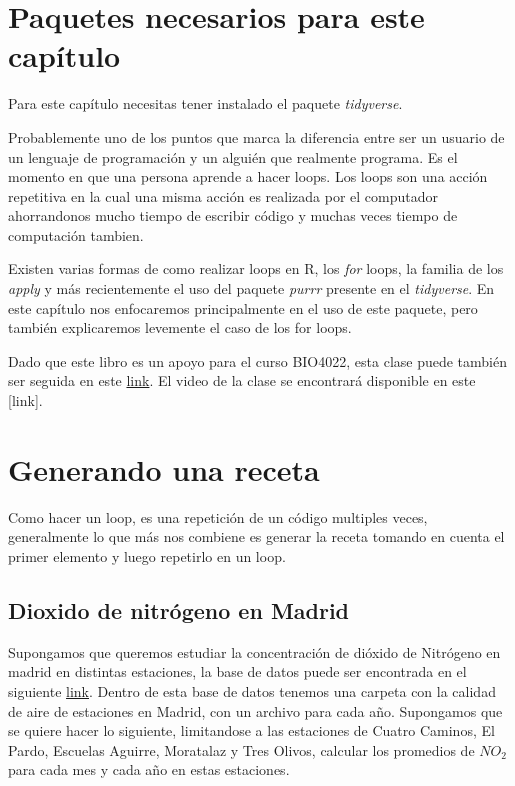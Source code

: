 \documentclass[]{book}
\begin{document}
\hypertarget{paquetes-necesarios-para-este-capitulo-5}{%
\section{Paquetes necesarios para este
capítulo}\label{paquetes-necesarios-para-este-capitulo-5}}

Para este capítulo necesitas tener instalado el paquete
\emph{tidyverse}.

Probablemente uno de los puntos que marca la diferencia entre ser un
usuario de un lenguaje de programación y un alguién que realmente
programa. Es el momento en que una persona aprende a hacer loops. Los
loops son una acción repetitiva en la cual una misma acción es realizada
por el computador ahorrandonos mucho tiempo de escribir código y muchas
veces tiempo de computación tambien.

Existen varias formas de como realizar loops en R, los \emph{for} loops,
la familia de los \emph{apply} y más recientemente el uso del paquete
\emph{purrr} \citep{HenryPurrr} presente en el \emph{tidyverse}. En este
capítulo nos enfocaremos principalmente en el uso de este paquete, pero
también explicaremos levemente el caso de los for loops.

Dado que este libro es un apoyo para el curso BIO4022, esta clase puede
también ser seguida en este
\href{https://derek-corcoran-barrios.github.io/Clase6/Clase6Loopsybibliografia}{link}.
El video de la clase se encontrará disponible en este {[}link{]}.

\hypertarget{generando-una-receta}{%
\section{Generando una receta}\label{generando-una-receta}}

Como hacer un loop, es una repetición de un código multiples veces,
generalmente lo que más nos combiene es generar la receta tomando en
cuenta el primer elemento y luego repetirlo en un loop.

\hypertarget{dioxido-de-nitrogeno-en-madrid}{%
\subsection{Dioxido de nitrógeno en
Madrid}\label{dioxido-de-nitrogeno-en-madrid}}

Supongamos que queremos estudiar la concentración de dióxido de
Nitrógeno en madrid en distintas estaciones, la base de datos puede ser
encontrada en el siguiente
\href{https://www.kaggle.com/decide-soluciones/air-quality-madrid}{link}.
Dentro de esta base de datos tenemos una carpeta con la calidad de aire
de estaciones en Madrid, con un archivo para cada año. Supongamos que se
quiere hacer lo siguiente, limitandose a las estaciones de Cuatro
Caminos, El Pardo, Escuelas Aguirre, Moratalaz y Tres Olivos, calcular
los promedios de \(NO_2\) para cada mes y cada año en estas estaciones.
\end{document}
